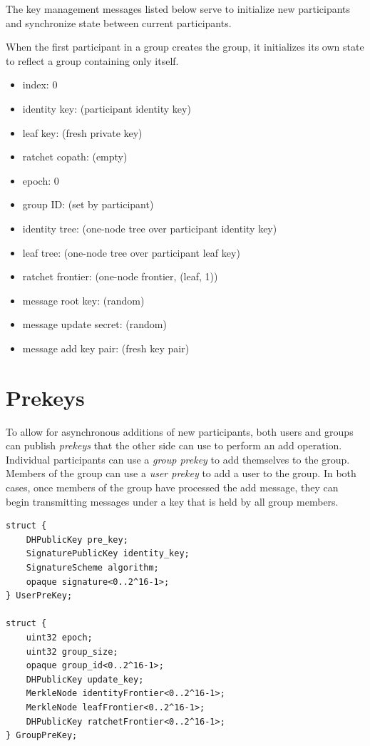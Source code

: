 \documentclass[11pt, oneside]{article}
\begin{document}
The key management messages listed below serve to initialize new participants and synchronize state between current participants.

When the first participant in a group creates the group, it initializes its own state to reflect a group containing only itself.

\begin{itemize}
\item{index: 0}
\item{identity key: (participant identity key)}
\item{leaf key: (fresh private key)}
\item{ratchet copath: (empty)}
\item{epoch: 0}
\item{group ID: (set by participant)}
\item{identity tree: (one-node tree over participant identity key)}
\item{leaf tree: (one-node tree over participant leaf key)}
\item{ratchet frontier: (one-node frontier, (leaf, 1))}
\item{message root key: (random)}
\item{message update secret: (random)}
\item{message add key pair: (fresh key pair)}
\end{itemize}


\section{Prekeys}

To allow for asynchronous additions of new participants, both users and groups can publish \emph{prekeys} that the other side can use to perform an add operation.  Individual participants can use a \emph{group prekey} to add themselves to the group.  Members of the group can use a \emph{user prekey} to add a user to the group.  In both cases, once members of the group have processed the add message, they can begin transmitting messages under a key that is held by all group members.

\begin{verbatim}
struct {
    DHPublicKey pre_key;
    SignaturePublicKey identity_key;
    SignatureScheme algorithm;
    opaque signature<0..2^16-1>;
} UserPreKey;

struct {
    uint32 epoch;
    uint32 group_size;
    opaque group_id<0..2^16-1>;
    DHPublicKey update_key;
    MerkleNode identityFrontier<0..2^16-1>;
    MerkleNode leafFrontier<0..2^16-1>;
    DHPublicKey ratchetFrontier<0..2^16-1>;
} GroupPreKey;
\end{verbatim}
\end{document}
